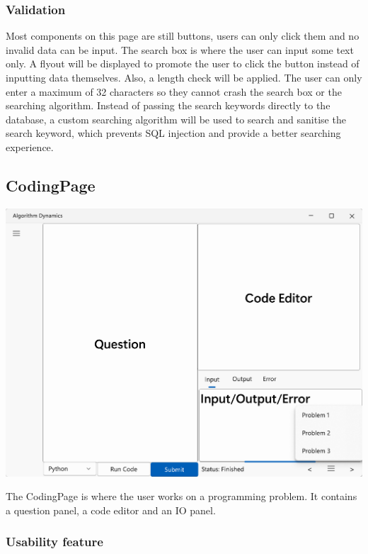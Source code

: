 \documentclass[a4paper]{report}
\begin{document}
\subsubsection{Validation}

Most components on this page are still buttons, users can only click them and no invalid data can be input. The search box is where the user can input some text only. A flyout will be displayed to promote the user to click the button instead of inputting data themselves. Also, a length check will be applied. The user can only enter a maximum of 32 characters so they cannot crash the search box or the searching algorithm. Instead of passing the search keywords directly to the database, a custom searching algorithm will be used to search and sanitise the search keyword, which prevents SQL injection and provide a better searching experience.

\subsection{CodingPage}
\label{sec:CodingPageDesign}

\includegraphics[width=\textwidth, height=\textheight, keepaspectratio]{CodingPage-design}

The CodingPage is where the user works on a programming problem. It contains a question panel, a code editor and an IO panel.

\subsubsection{Usability feature}
\end{document}
